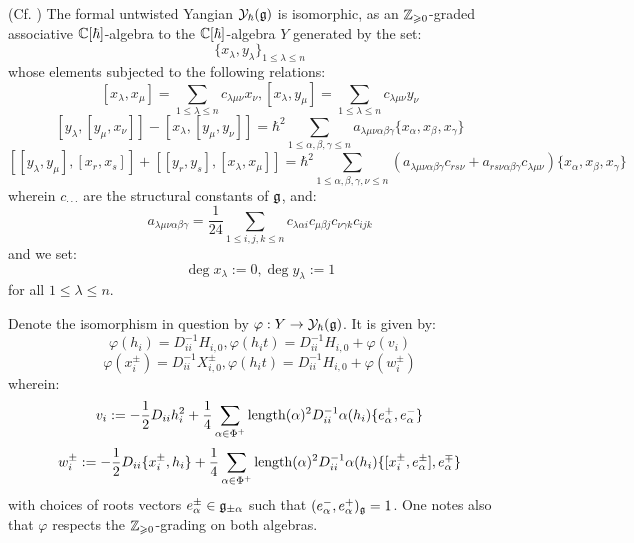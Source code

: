         \begin{theorem} \label{theorem: drinfeld_current_presentation}
            (Cf. \cite[Theorem 12.1.3]{chari_pressley_quantum_groups}) The formal untwisted Yangian $\mathcal{Y}_{\hbar}(\mathfrak{g})$ is isomorphic, as an $\mathbb{Z}_{\geqslant 0}$-graded associative $\mathbb{C}[\hbar]$-algebra to the $\mathbb{C}[\hbar]$-algebra $Y$ generated by the set:
                $$\{ x_{\lambda}, y_{\lambda} \}_{1 \leq \lambda \leq n}$$
            whose elements subjected to the following relations:
                $$[ x_{\lambda}, x_{\mu} ] = \sum_{1 \leq \lambda \leq n} c_{\lambda \mu \nu} x_{\nu}, [ x_{\lambda}, y_{\mu} ] = \sum_{1 \leq \lambda \leq n} c_{\lambda \mu \nu} y_{\nu}$$
                $$[ y_{\lambda}, [y_{\mu}, x_{\nu}] ] - [ x_{\lambda}, [y_{\mu}, y_{\nu}] ] = \hbar^2 \sum_{1 \leq \alpha, \beta, \gamma \leq n} a_{\lambda \mu \nu \alpha \beta \gamma} \{ x_{\alpha}, x_{\beta}, x_{\gamma} \}$$
                $$[ [y_{\lambda}, y_{\mu}], [x_r, x_s] ] + [ [y_r, y_s], [x_{\lambda}, x_{\mu}] ] = \hbar^2 \sum_{1 \leq \alpha, \beta, \gamma, \nu \leq n} ( a_{\lambda \mu \nu \alpha \beta \gamma} c_{r s \nu} + a_{r s \nu \alpha \beta \gamma} c_{\lambda \mu \nu} ) \{ x_{\alpha}, x_{\beta}, x_{\gamma} \}$$
            wherein $c_{\cdot \cdot \cdot}$ are the structural constants of $\mathfrak{g}$, and:
                $$a_{\lambda \mu \nu \alpha \beta \gamma} = \frac{1}{24} \sum_{1 \leq i, j, k \leq n} c_{\lambda \alpha i} c_{\mu \beta j} c_{\nu \gamma k} c_{i j k}$$
            and we set:
                $$\deg x_{\lambda} := 0, \deg y_{\lambda} := 1$$
            for all $1 \leq \lambda \leq n$.
            
            Denote the isomorphism in question by $\varphi: Y \to \mathcal{Y}_{\hbar}(\mathfrak{g})$. It is given by:
                $$\varphi(h_i) = D_{ii}^{-1} H_{i, 0}, \varphi(h_i t) = D_{ii}^{-1} H_{i, 0} + \varphi(v_i)$$
                $$\varphi(x_i^{\pm}) = D_{ii}^{-1} X_{i, 0}^{\pm}, \varphi(h_i t) = D_{ii}^{-1} H_{i, 0} + \varphi(w_i^{\pm})$$
            wherein:
                $$v_i := -\frac12 D_{ii} h_i^2 + \frac14 \sum_{\alpha \in \Phi^+} \operatorname{length}(\alpha)^2 D_{ii}^{-1} \alpha(h_i) \{e_{\alpha}^+, e_{\alpha}^-\}$$
                $$w_i^{\pm} := -\frac12 D_{ii} \{x_i^{\pm}, h_i\} + \frac14 \sum_{\alpha \in \Phi^+} \operatorname{length}(\alpha)^2 D_{ii}^{-1} \alpha(h_i) \{[x_i^{\pm}, e_{\alpha}^{\pm}], e_{\alpha}^{\mp}\}$$
            with choices of roots vectors $e_{\alpha}^{\pm} \in \mathfrak{g}_{\pm \alpha}$ such that $(e_{\alpha}^-, e_{\alpha}^+)_{\mathfrak{g}} = 1$. One notes also that $\varphi$ respects the $\mathbb{Z}_{\geqslant 0}$-grading on both algebras.
        \end{theorem}

